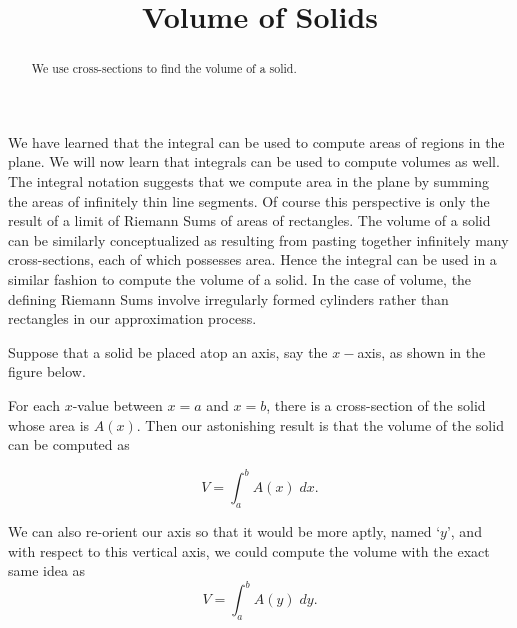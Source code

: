 \documentclass{ximera}
\title{Volume of Solids}
\begin{document}
\begin{abstract}
We use cross-sections to find the volume of a solid.
\end{abstract}

\maketitle


We have learned that the integral can be used to compute areas of regions in the plane.  
We will now learn that integrals can be used to compute volumes as well.
The integral notation suggests that we compute area in the plane by summing the areas of  infinitely thin line segments.
Of course this perspective is only the result of a limit of Riemann Sums of areas of rectangles.
The volume of a solid can be similarly conceptualized as resulting from pasting together infinitely many cross-sections,
each of which possesses area. Hence the integral can be used in a similar fashion to compute the volume of a solid.
In the case of volume, the defining Riemann Sums involve irregularly formed cylinders rather than rectangles
in our approximation process.



Suppose that a solid be placed atop an axis, say the $x-$axis, as shown in the figure below.


For each $x$-value between $x = a$ and $x = b$,  there is a cross-section of the solid whose area is $A(x)$.
Then our astonishing result is that the volume of the solid can be computed as

\[
V = \int_a^b A(x) \; dx.
\]

\begin{remark}
We can also re-orient our axis so that it would be more aptly, named `$y$', and with respect to this vertical axis, 
we could compute the volume with the exact same idea as
\[
V = \int_a^b A(y) \; dy.
\]

\end{remark}

\end{document}
